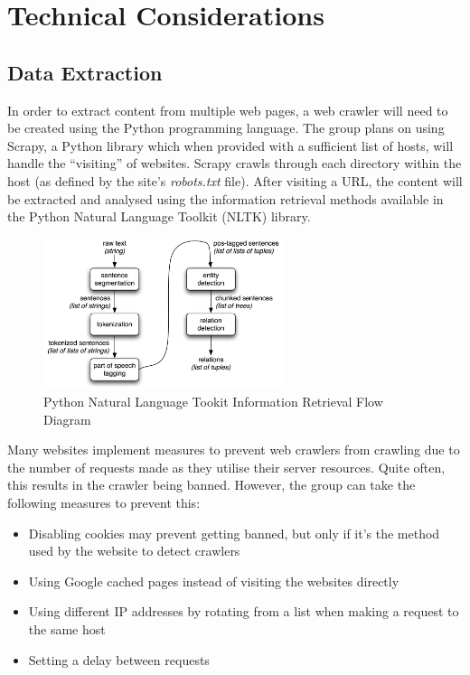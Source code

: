 \section{Technical Considerations}

\subsection{Data Extraction}

In order to extract content from multiple web pages, a web crawler will need to be created using the Python programming language. The group plans on using Scrapy, a Python library which when provided with a sufficient list of hosts, will handle the ``visiting'' of websites. Scrapy crawls through each directory within the host (as defined by the site's \textsl{robots.txt} file). After visiting a URL, the content will be extracted and analysed using the information retrieval methods available in the Python Natural Language Toolkit (NLTK) library.

\begin{figure}
  \centering
  \begin{minipage}{7cm}
    \centering
    \includegraphics[width=7cm]{inc/ie-architecture.jpg}
    \caption{Python Natural Language Tookit Information Retrieval Flow Diagram}
    \label{fig:information_retrieval}
  \end{minipage}
\end{figure}

Many websites implement measures to prevent web crawlers from crawling due to the number of requests made as they utilise their server resources. Quite often, this results in the crawler being banned. However, the group can take the following measures to prevent this:

\begin{itemize}
  \item Disabling cookies may prevent getting banned, but only if it's the method used by the website to detect crawlers
  \item Using Google cached pages instead of visiting the websites directly
  \item Using different IP addresses by rotating from a list when making a request to the same host
  \item Setting a delay between requests
\end{itemize}

